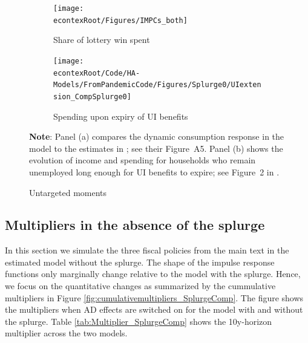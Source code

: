 \documentclass[\econtexRoot/HAFiscal]{subfiles}
\begin{document}
\begin{figure}[thb]
	\centering
	\begin{subfigure}[b]{.48\linewidth}
		\centering
		\texttt{[image: \\econtexRoot/Figures/IMPCs\_both]}
		\caption{Share of lottery win spent}
		\notinsubfile{\label{fig:USaggmpclotterywin_wSplZero}}
	\end{subfigure}
	\begin{subfigure}[b]{.48\linewidth}
		\centering
		\texttt{[image: \\econtexRoot/Code/HA-Models/FromPandemicCode/Figures/Splurge0/UIextension\_CompSplurge0]}
		\caption{Spending upon expiry of UI benefits}
		\notinsubfile{\label{fig:expiryUI_wSplZero}}
	\end{subfigure}%
	\caption{Untargeted moments}
	\notinsubfile{\label{fig:untargetedMoments_wSplZero}}
	\parbox{16cm}{\small \vspace{.15cm} \textbf{Note}: Panel (a) compares the dynamic consumption response in the model to the estimates in \citet{fagereng_mpc_2021}; see their Figure~A5.
Panel (b) shows the evolution of income and spending for households who remain unemployed long enough for UI benefits to expire; see Figure~2 in \citet{ganongConsumer2019}.\normalsize}
\end{figure}



\FloatBarrier
\subsection{Multipliers in the absence of the splurge}

In this section we simulate the three fiscal policies from the main text in the estimated model without the splurge.
The shape of the impulse response functions only marginally change relative to the model with the splurge.
Hence, we focus on the quantitative changes as summarized by the cummulative multipliers in Figure \ref{fig:cumulativemultipliers_SplurgeComp}.
The figure shows the multipliers when AD effects are switched on for the model with and without the splurge.
Table \ref{tab:Multiplier_SplurgeComp} shows the 10y-horizon multiplier across the two models.
\end{document}
